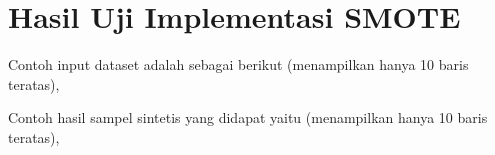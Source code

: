 \newpage
\section{Hasil Uji Implementasi SMOTE}
\label{appendix:smote_raw}

Contoh input dataset adalah sebagai berikut (menampilkan hanya 10 baris teratas),


Contoh hasil sampel sintetis yang didapat yaitu (menampilkan hanya 10 baris teratas),

